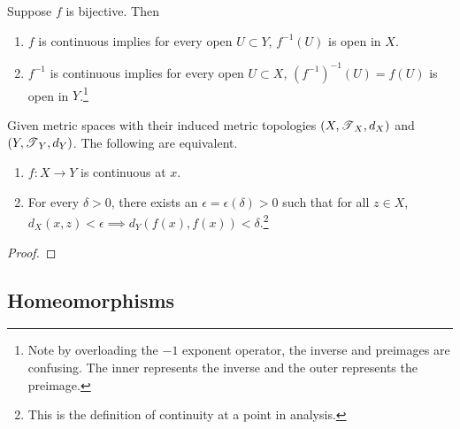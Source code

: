     \begin{theorem}
      Suppose $f$ is bijective. Then 
      \begin{enumerate}
        \item $f$ is continuous implies for every open $U \subset Y$, $f^{-1} (U)$ is open in $X$. 
        \item $f^{-1}$ is continuous implies for every open $U \subset X$, $(f^{-1})^{-1} (U) = f(U)$ is open in $Y$.\footnote{Note by overloading the $-1$ exponent operator, the inverse and preimages are confusing. The inner represents the inverse and the outer represents the preimage. }
      \end{enumerate}
    \end{theorem} 

    \begin{theorem}[Analytic Continuity = Topological Continuity] 
      Given metric spaces with their induced metric topologies $(X, \T_X, d_X)$ and $(Y, \T_Y, d_Y)$. The following are equivalent. 
      \begin{enumerate}
        \item $f: X \rightarrow Y$ is continuous at $x$. 
        \item For every $\delta > 0$, there exists an $\epsilon = \epsilon(\delta) > 0$ such that for all $z \in X$, $d_X (x, z) < \epsilon \implies d_Y (f(x), f(x)) < \delta$.\footnote{This is the definition of continuity at a point in analysis.} 
      \end{enumerate}
    \end{theorem}
    \begin{proof}
      
    \end{proof}

  \subsection{Homeomorphisms}

